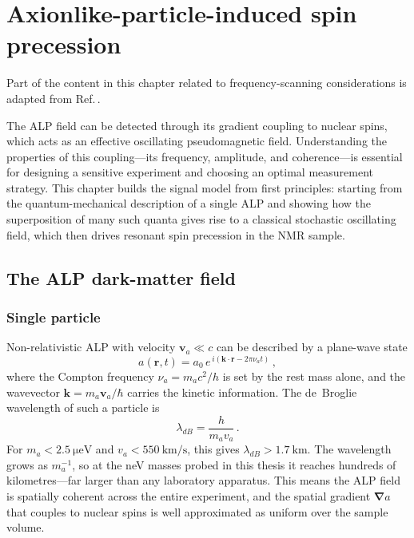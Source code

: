 \chapter{Axionlike-particle-induced spin precession}\label{chap:theory}
\begin{jointwork}
    Part of the content in this chapter related to frequency-scanning considerations is adapted from Ref.\,\cite{Yuzhe2023_FrequencyScanning}. 
\end{jointwork}

The ALP field can be detected through its gradient coupling to nuclear spins, which acts as an effective oscillating pseudomagnetic field. Understanding the properties of this coupling---its frequency, amplitude, and coherence---is essential for designing a sensitive experiment and choosing an optimal measurement strategy. This chapter builds the signal model from first principles: starting from the quantum-mechanical description of a single ALP and showing how the superposition of many such quanta gives rise to a classical stochastic oscillating field, which then drives resonant spin precession in the NMR sample.


\section{The ALP dark-matter field}\label{sec:theory:ALPfield}


\subsection{Single particle}\label{sec:theory:singleparticle}


Non-relativistic ALP with velocity $\mathbf{v}_a \ll c$ can be described by a plane-wave state
\begin{equation}
    a(\mathbf{r}, t)
    = a_0\, e^{\,i\left(\mathbf{k}\cdot\mathbf{r} - 2\pi\nu_a t\right)}
    \,,\label{eq:single_ALP_wave}
\end{equation}
where the Compton frequency $\nu_a = m_a c^2/h$ is set by the rest mass alone, and the wavevector $\mathbf{k} = m_a \mathbf{v}_a/\hbar$ carries the kinetic information. 
The de~Broglie wavelength of such a particle is
\begin{equation}
    \lambda_{dB}
    = \frac{h}{m_a v_a}
    \,.\label{eq:lambda_dB}
\end{equation}
For $m_a < \SI{2.5}{\micro\eV}$ and $v_a < \SI{550}{\km\per\s}$\cite{Evans2019_SHMRefined}, this gives $\lambda_{dB} > \SI{1.7}{\km}$. 
The wavelength grows as $m_a^{-1}$, so at the neV masses probed in this thesis it reaches hundreds of kilometres---far larger than any laboratory apparatus. 
This means the ALP field is spatially coherent across the entire experiment, and the spatial gradient $\boldsymbol{\nabla}a$ that couples to nuclear spins is well approximated as uniform over the sample volume.

